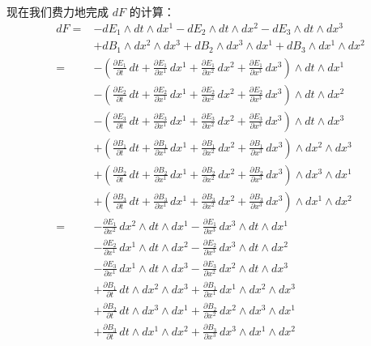 现在我们费力地完成 $dF$ 的计算：
\[
\begin{aligned}
dF={}&-dE_1\wedge dt\wedge dx^1-dE_2\wedge dt\wedge dx^2-dE_3\wedge dt\wedge dx^3\\
&+dB_1\wedge dx^2\wedge dx^3+dB_2\wedge dx^3\wedge dx^1+dB_3\wedge dx^1\wedge dx^2\\
={}&-\left(\frac{\partial E_1}{\partial t}\,dt+\frac{\partial E_1}{\partial x^1}\,dx^1+\frac{\partial E_1}{\partial x^2}\,dx^2+\frac{\partial E_1}{\partial x^3}\,dx^3\right)\wedge dt\wedge dx^1\\
&-\left(\frac{\partial E_2}{\partial t}\,dt+\frac{\partial E_2}{\partial x^1}\,dx^1+\frac{\partial E_2}{\partial x^2}\,dx^2+\frac{\partial E_2}{\partial x^3}\,dx^3\right)\wedge dt\wedge dx^2\\
&-\left(\frac{\partial E_3}{\partial t}\,dt+\frac{\partial E_3}{\partial x^1}\,dx^1+\frac{\partial E_3}{\partial x^2}\,dx^2+\frac{\partial E_3}{\partial x^3}\,dx^3\right)\wedge dt\wedge dx^3\\
&+\left(\frac{\partial B_1}{\partial t}\,dt+\frac{\partial B_1}{\partial x^1}\,dx^1+\frac{\partial B_1}{\partial x^2}\,dx^2+\frac{\partial B_1}{\partial x^3}\,dx^3\right)\wedge dx^2\wedge dx^3\\
&+\left(\frac{\partial B_2}{\partial t}\,dt+\frac{\partial B_2}{\partial x^1}\,dx^1+\frac{\partial B_2}{\partial x^2}\,dx^2+\frac{\partial B_2}{\partial x^3}\,dx^3\right)\wedge dx^3\wedge dx^1\\
&+\left(\frac{\partial B_3}{\partial t}\,dt+\frac{\partial B_3}{\partial x^1}\,dx^1+\frac{\partial B_3}{\partial x^2}\,dx^2+\frac{\partial B_3}{\partial x^3}\,dx^3\right)\wedge dx^1\wedge dx^2\\
={}&-\frac{\partial E_1}{\partial x^2}\,dx^2\wedge dt\wedge dx^1-\frac{\partial E_1}{\partial x^3}\,dx^3\wedge dt\wedge dx^1\\
&-\frac{\partial E_2}{\partial x^1}\,dx^1\wedge dt\wedge dx^2-\frac{\partial E_2}{\partial x^3}\,dx^3\wedge dt\wedge dx^2\\
&-\frac{\partial E_3}{\partial x^1}\,dx^1\wedge dt\wedge dx^3-\frac{\partial E_3}{\partial x^2}\,dx^2\wedge dt\wedge dx^3\\
&+\frac{\partial B_1}{\partial t}\,dt\wedge dx^2\wedge dx^3+\frac{\partial B_1}{\partial x^1}\,dx^1\wedge dx^2\wedge dx^3\\
&+\frac{\partial B_2}{\partial t}\,dt\wedge dx^3\wedge dx^1+\frac{\partial B_2}{\partial x^2}\,dx^2\wedge dx^3\wedge dx^1\\
&+\frac{\partial B_3}{\partial t}\,dt\wedge dx^1\wedge dx^2+\frac{\partial B_3}{\partial x^3}\,dx^3\wedge dx^1\wedge dx^2\\

\end{aligned}\]

